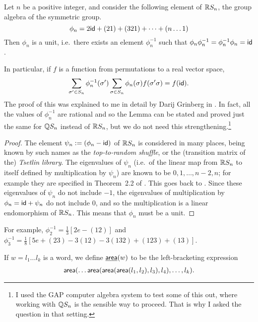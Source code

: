 \begin{lemma}
  Let $n$ be a  positive integer, and consider the following element of $\mathbb{R} S_n$, the group algebra of the symmetric group.
  \begin{equation}
    \label{eq:phi}
    \phi_n=2\id+(21)+(321)+\dots+(n\dots 1)\jindmath{\phi_n}{phi}
  \end{equation}
  Then $\phi_n$ is a unit, 
i.e.~there exists an element $\phi_n^{-1}$ such that $\phi_n\phi_n^{-1}=\phi_n^{-1}\phi_n=\mathsf{id}$.
\end{lemma}
In particular, if $f$ is a function from permutations to a real vector space,
\begin{align}
  \sum_{\sigma'\in S_n}\phi_n^{-1}(\sigma')\sum_{\sigma\in S_n}\phi_n(\sigma)f(\sigma'\sigma)=f(\mathsf{id}).\label{eq:interpretInverse}
\end{align}
The proof of this was explained to me in detail by Darij Grinberg in \cite{GroupAlgMO}.
In fact, all the values of $\phi_n^{-1}$ are rational and so the Lemma can be stated and proved just the same for $\mathbb{Q} S_n$ instead of $\mathbb{R} S_n$, but we do not need this strengthening.\footnote{I used the GAP computer algebra system to test some of this out, where working with $\mathbb{Q} S_n$ is the sensible way to proceed. That is why I asked the question in that setting.}
\begin{proof}
The element $\psi_n:=(\phi_n-\mathsf{id})$ of $\mathbb{R} S_n$ is considered in many places, being known by such names as the \emph{top-to-random shuffle},
or the (transition matrix of the) \emph{Tsetlin library}.
The eigenvalues of $\psi_n$ (i.e.~of the linear map from $\mathbb{R} S_n$ to itself defined by multiplication by $\psi_n$) are known to be $0, 1,\dots,n-2,n$; for example they are specified in Theorem~2.2 of \cite{Garsia}.
This goes back to \cite{TopToRandom}.
Since these eigenvalues of $\psi_n$ do not include $-1$, the eigenvalues of multiplication by $\phi_n=\mathsf{id}+\psi_n$ do not include 0, and so the multiplication is a linear endomorphism of $\mathbb{R} S_n$. This means that $\phi_n$ must be a unit.
\end{proof}

For example, $\phi_2^{-1}=\frac13[2e-(12)]$ and $\phi_3^{-1}=\frac18[5e+(23)-3(12)-3(132)+(123)+(13)]$.

\begin{definition}
If $w=l_1\dots l_k$ is a word, we define $\underline{\mathsf{area}}(w)$ to be the left-bracketing expression
\begin{align}
\mathsf{area}(\dots\mathsf{area}(\mathsf{area}(\mathsf{area}(l_1,l_2),l_3),l_4),\dots,l_k).
\end{align}
\end{definition}

